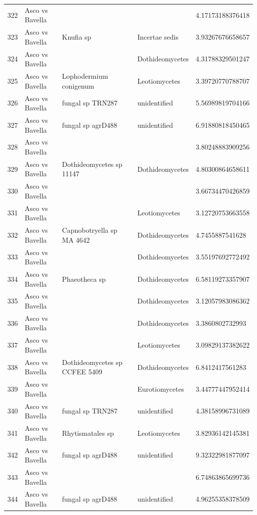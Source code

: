 \documentclass[12pt]{article}\usepackage[]{graphicx}\usepackage[]{color}
\numberwithin{figure}{section}
\begin{document}
\begin{table}[ht]
\begin{tabular}{lllll}
  322 & Asco vs Bavella &  &  & 4.17173188376418 \\ 
  323 & Asco vs Bavella & Knufia sp & Incertae sedis & 3.93267676658657 \\ 
  324 & Asco vs Bavella &  & Dothideomycetes & 4.31788329501247 \\ 
  325 & Asco vs Bavella & Lophodermium conigenum & Leotiomycetes & 3.39720770788707 \\ 
  326 & Asco vs Bavella & fungal sp TRN287 & unidentified & 5.56989819704166 \\ 
  327 & Asco vs Bavella & fungal sp agrD488 & unidentified & 6.91880818450465 \\ 
  328 & Asco vs Bavella &  &  & 3.80248883909256 \\ 
  329 & Asco vs Bavella & Dothideomycetes sp 11147 & Dothideomycetes & 4.80300864658611 \\ 
  330 & Asco vs Bavella &  &  & 3.66734470426859 \\ 
  331 & Asco vs Bavella &  & Leotiomycetes & 3.12720753663558 \\ 
  332 & Asco vs Bavella & Capnobotryella sp MA 4642 & Dothideomycetes & 4.7455887541628 \\ 
  333 & Asco vs Bavella &  & Dothideomycetes & 3.55197692772492 \\ 
  334 & Asco vs Bavella & Phaeotheca sp & Dothideomycetes & 6.58119273357907 \\ 
  335 & Asco vs Bavella &  & Dothideomycetes & 3.12057983086362 \\ 
  336 & Asco vs Bavella &  & Dothideomycetes & 3.3860802732993 \\ 
  337 & Asco vs Bavella &  & Leotiomycetes & 3.09829137382622 \\ 
  338 & Asco vs Bavella & Dothideomycetes sp CCFEE 5409 & Dothideomycetes & 6.8412417561283 \\ 
  339 & Asco vs Bavella &  & Eurotiomycetes & 3.44777447952414 \\ 
  340 & Asco vs Bavella & fungal sp TRN287 & unidentified & 4.38158996731089 \\ 
  341 & Asco vs Bavella & Rhytismatales sp & Leotiomycetes & 3.82936142145381 \\ 
  342 & Asco vs Bavella & fungal sp agrD488 & unidentified & 9.32322981877097 \\ 
  343 & Asco vs Bavella &  &  & 6.74863865699736 \\ 
  344 & Asco vs Bavella & fungal sp agrD488 & unidentified & 4.96255358378509 \\ 

\end{tabular}
\end{table}
\end{document}
